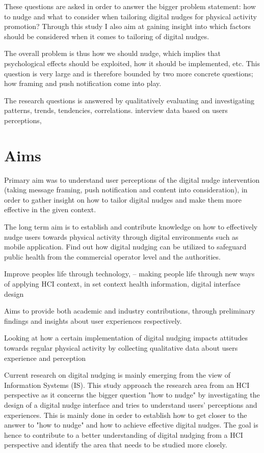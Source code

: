 These questions are asked in order to answer the bigger problem statement: how to nudge and what to consider when tailoring digital nudges for physical activity promotion? Through this study I also aim at gaining insight into which factors should be considered when it comes to tailoring of digital nudges.  

The overall problem is thus how we should nudge, which implies that psychological effects should be exploited, how it should be implemented, etc. This question is very large and is therefore bounded by two more concrete questions; how framing and push notification come into play.

The research questions is answered by qualitatively evaluating and investigating patterns, trends, tendencies, correlations. interview data based on users perceptions,  

\section{Aims}
Primary aim was to understand user perceptions of the digital nudge intervention (taking message framing, push notification and content into consideration), in order to gather insight on how to tailor digital nudges and make them more effective in the given context. 

The long term aim is to establish and contribute knowledge on how to effectively nudge users towards physical activity through digital environments such as mobile application. Find out how digital nudging can be utilized to safeguard public health from the commercial operator level and the authorities. 

Improve peoples life through technology, -- making people life through new ways of applying HCI context, in set context health information, digital interface design

Aims to provide both academic and industry contributions, through preliminary findings and insights about user experiences respectively. 

Looking at how a certain implementation of digital nudging impacts attitudes towards regular physical activity by collecting qualitative data about users experience and perception

Current research on digital nudging is mainly emerging from the view of Information Systems (IS). This study approach the research area from an HCI perspective as it concerns the bigger question "how to nudge" by investigating the design of a digital nudge interface and tries to understand users' perceptions and experiences. This is mainly done in order to establish how to get closer to the answer to "how to nudge" and how to achieve effective digital nudges. The goal is hence to contribute to a better understanding of digital nudging from a HCI perspective and identify the area that needs to be studied more closely. 

